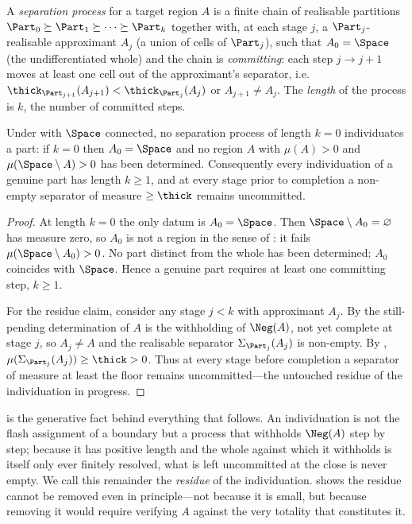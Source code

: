 \begin{definition}
\label{def:process}
A \emph{separation process} for a target region $A$ is a finite chain of
realisable partitions
$\Part_0\succeq\Part_1\succeq\cdots\succeq\Part_k$
together with, at each stage $j$, a $\Part_j$-realisable approximant $A_j$
(a union of cells of $\Part_j$), such that $A_0=\Space$ \textup{(}the
undifferentiated whole\textup{)} and the chain is \emph{committing}: each step
$j\to j+1$ moves at least one cell out of the approximant's separator, i.e.\
$\thick_{\Part_{j+1}}(A_{j+1})<\thick_{\Part_j}(A_j)$ or
$A_{j+1}\neq A_j$. The \emph{length} of the process is $k$, the number of
committed steps.
\end{definition}

\begin{theorem}
\label{thm:noninstant}
Under  with $\Space$ connected, no separation process of length
$k=0$ individuates a part: if $k=0$ then $A_0=\Space$ and no region $A$ with
$\mu(A)>0$ and $\mu(\Space\setminus A)>0$ has been determined. Consequently every
individuation of a genuine part has length $k\ge1$, and at every stage prior to
completion a non-empty separator of measure $\ge\thick$ remains uncommitted.
\end{theorem}

\begin{proof}
At length $k=0$ the only datum is $A_0=\Space$. Then $\Space\setminus A_0=\varnothing$
has measure zero, so $A_0$ is not a region in the sense of \Cref{def:region}: it
fails $\mu(\Space\setminus A_0)>0$. No part distinct from the whole has been
determined; $A_0$ coincides with $\Space$. Hence a genuine part requires at least
one committing step, $k\ge1$.

For the residue claim, consider any stage $j<k$ with approximant $A_j$. By
\Cref{thm:negation-unique} the still-pending determination of $A$ is the
withholding of $\Neg(A)$, not yet complete at stage $j$, so $A_j\neq A$ and the
realisable separator $\Sigma_{\Part_j}(A_j)$ is non-empty. By
, $\mu(\Sigma_{\Part_j}(A_j))\ge\thick>0$. Thus at every
stage before completion a separator of measure at least the floor remains
uncommitted---the untouched residue of the individuation in progress.
\end{proof}

\begin{remark}
\label{rem:residue-origin}
 is the generative fact behind everything that follows. An
individuation is not the flash assignment of a boundary but a process that
withholds $\Neg(A)$ step by step; because it has positive length and the whole
against which it withholds is itself only ever finitely resolved, what is left
uncommitted at the close is never empty. We call this remainder the
\emph{residue} of the individuation. \Cref{sec:residue} shows the residue cannot
be removed even in principle---not because it is small, but because removing it
would require verifying $A$ against the very totality that constitutes it.
\end{remark}

